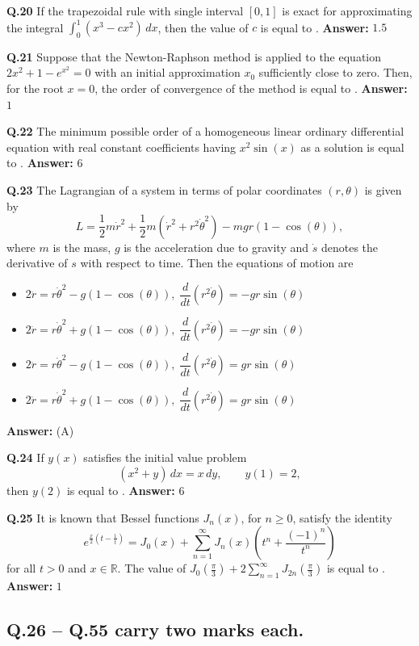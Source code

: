 \documentclass[11pt,a4paper]{article}
\newcommand{\optslistA}[4]{%
  \begin{itemize}
    \setlength{\itemsep}{2pt}\setlength{\parskip}{0pt}
    \item[(A)] #1
    \item[(B)] #2
    \item[(C)] #3
    \item[(D)] #4
  \end{itemize}%
}
\newcommand{\ans}[1]{\textbf{Answer:} #1\par\medskip}
\begin{document}
\textbf{Q.20} If the trapezoidal rule with single interval $[0, 1]$ is exact for approximating the integral $\int_0^1 (x^3 - c x^2)\,dx$, then the value of $c$ is equal to \underline{\hspace{2cm}}.
\ans{$1.5$}

\textbf{Q.21} Suppose that the Newton-Raphson method is applied to the equation $2x^2 + 1 - e^{x^2} = 0$ with an initial approximation $x_0$ sufficiently close to zero. Then, for the root $x = 0$, the order of convergence of the method is equal to \underline{\hspace{2cm}}.
\ans{$1$}

\textbf{Q.22} The minimum possible order of a homogeneous linear ordinary differential equation with real constant coefficients having $x^2 \sin(x)$ as a solution is equal to \underline{\hspace{2cm}}.
\ans{$6$}

\textbf{Q.23} The Lagrangian of a system in terms of polar coordinates $(r, \theta)$ is given by
\[
  L = \frac{1}{2} m \dot{r}^2 + \frac{1}{2} m (\dot{r}^2 + r^2 \dot{\theta}^2) - m g r (1 - \cos(\theta)),
\]
where $m$ is the mass, $g$ is the acceleration due to gravity and $\dot{s}$ denotes the derivative of $s$ with respect to time. Then the equations of motion are
\optslistA{$2\ddot{r} = r\dot{\theta}^2 - g(1 - \cos(\theta)),\; \dfrac{d}{dt}(r^2\dot{\theta}) = -gr\sin(\theta)$}{$2\ddot{r} = r\dot{\theta}^2 + g(1 - \cos(\theta)),\; \dfrac{d}{dt}(r^2\dot{\theta}) = -gr\sin(\theta)$}{$2\ddot{r} = r\dot{\theta}^2 - g(1 - \cos(\theta)),\; \dfrac{d}{dt}(r^2\dot{\theta}) = gr\sin(\theta)$}{$2\ddot{r} = r\dot{\theta}^2 + g(1 - \cos(\theta)),\; \dfrac{d}{dt}(r^2\dot{\theta}) = gr\sin(\theta)$}
\ans{(A)}

\textbf{Q.24} If $y(x)$ satisfies the initial value problem
\[
  (x^2 + y)\,dx = x\,dy, \qquad y(1) = 2,
\]
then $y(2)$ is equal to \underline{\hspace{2cm}}.
\ans{$6$}

\textbf{Q.25} It is known that Bessel functions $J_n(x)$, for $n \ge 0$, satisfy the identity
\[
  e^{\frac{x}{2}\left(t - \frac{1}{t}\right)} = J_0(x) + \sum_{n=1}^{\infty} J_n(x) \left(t^n + \frac{(-1)^n}{t^n}\right)
\]
for all $t > 0$ and $x \in \mathbb{R}$. The value of $J_0\!\left(\frac{\pi}{3}\right) + 2 \sum_{n=1}^{\infty} J_{2n}\!\left(\frac{\pi}{3}\right)$ is equal to \underline{\hspace{2cm}}.
\ans{$1$}

\subsection*{Q.26 -- Q.55 carry two marks each.}
\end{document}
